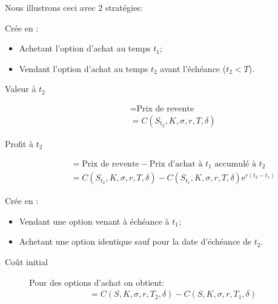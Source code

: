 \documentclass[10pt, french]{article}
\begin{document}
\begin{multicols*}{2}
Nous illustrons ceci avec 2 stratégies:

\begin{definitionNOHFILL}
Crée en :
\begin{itemize}[leftmargin = *]
	\item	Achetant l'option d'achat au temps $t_{1}$;
	\item	Vendant l'option d'achat au temps $t_{2}$ avant l'échéance ($t_{2} < T$).
\end{itemize}

\begin{description}
	\item[Valeur à $t_{2}$]	
		\begin{align*}
		&=	\text{Prix de revente}	\\
		&=	C(S_{t_{2}}, K, \sigma, r, T, \delta)
		\end{align*}
	\item[Profit à $t_{2}$]	
		\begin{align*}
		&=	\text{Prix de revente} - \text{Prix d'achat à $t_{1}$ accumulé à $t_{2}$}	\\
		&=	C(S_{t_{2}}, K, \sigma, r, T, \delta) - C(S_{t_{1}}, K, \sigma, r, T, \delta) \textrm{e}^{r(t_{2} - t_{1})}
		\end{align*}
\end{description}
\end{definitionNOHFILL}

\begin{definitionNOHFILL}
Crée en :
\begin{itemize}[leftmargin = *]
	\item	Vendant une option venant à échéance à $t_{1}$;
	\item	Achetant une option identique sauf pour la date d'échéance de $t_{2}$.
\end{itemize}

\begin{description}
	\item[Coût initial]	Pour des options d'achat on obtient:
		\begin{align*}
		&=	C(S, K, \sigma, r, T_{2}, \delta) - C(S, K, \sigma, r, T_{1}, \delta) 
		\end{align*}
\end{description}


\end{definitionNOHFILL}
\end{multicols*}
\end{document}
